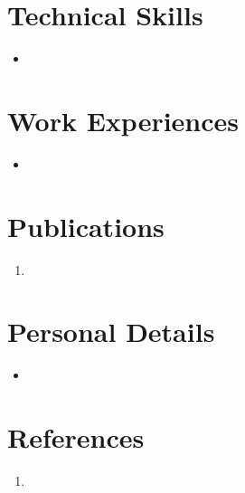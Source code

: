 \documentclass{cv_class}
\begin{document}

\section{Technical Skills}
\begin{itemize}
\item
\end{itemize}


\section{Work Experiences}
\begin{itemize}
\item
\end{itemize}


\section{Publications}
\begin{enumerate}
\item
\end{enumerate}


\section{Personal Details}
\begin{itemize}
\item
\end{itemize}


\newpage

\section{References}
\begin{enumerate}
\item
\end{enumerate}

\end{document}
